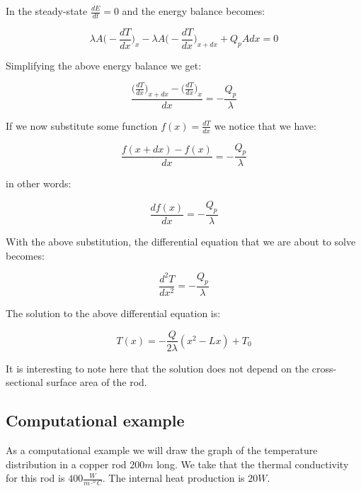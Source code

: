 \documentclass[10pt]{article}
\begin{document}
In the steady-state $\frac{dE}{dt} = 0$ and the energy balance becomes:


\begin{equation}
\lambda A \Big(- \frac{dT}{dx} \Big)_x - \lambda A \Big(- \frac{dT}{dx} \Big)_{x + dx} + Q_p A dx = 0
\end{equation}

Simplifying the above energy balance we get:

\begin{equation*}
\frac{\Big(\frac{dT}{dx} \Big)_{x + dx} - \Big(\frac{dT}{dx} \Big)_x  }{dx} = - \frac{Q_p}{\lambda}
\end{equation*}

If we now substitute some function $f(x) = \frac{dT}{dx}$ we notice that we have:

\begin{equation*}
\frac{f(x + dx) - f(x)}{dx} = - \frac{Q_p}{\lambda}
\end{equation*}

\newpage

in other words:

\begin{equation}
\frac{df(x)}{dx} = - \frac{Q_p}{\lambda}
\end{equation}

With the above substitution, the differential equation that we are about to solve becomes:

\begin{equation}
\frac{d^2T}{dx^2} = - \frac{Q_p}{\lambda}
\end{equation}

The solution to the above differential equation is:

\begin{equation}
T(x) = - \frac{Q}{2 \lambda} (x^2 - Lx) + T_0
\label{eq:solution}
\end{equation}

It is interesting to note here that the solution does not depend on the cross-sectional surface area of the rod.




\subsection*{Computational example}

As a computational example we will draw the graph of the temperature distribution in a copper rod $200 m$ long. We take that the thermal conductivity for this rod is $400 \frac{W}{m \cdot ^o C}$. The internal heat production is $20 W$.
\end{document}
